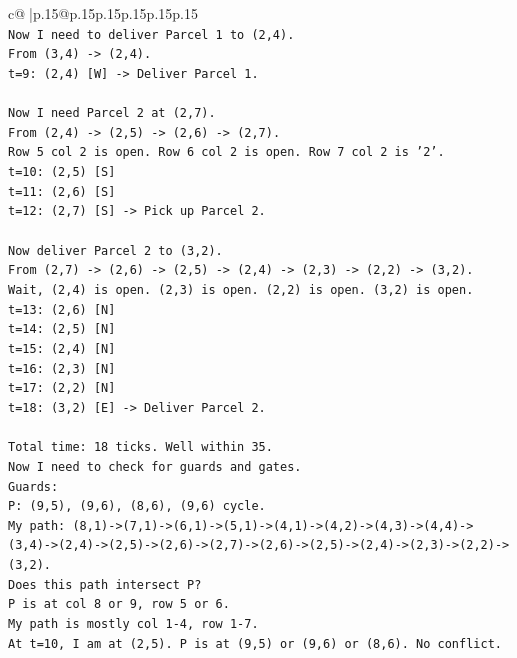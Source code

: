 \documentclass{article}
\begin{document}
{\begin{supertabular}{c@{$\;$}|p{.15\linewidth}@{}p{.15\linewidth}p{.15\linewidth}p{.15\linewidth}p{.15\linewidth}p{.15\linewidth}}
{{{\\ 
\texttt{Now I need to deliver Parcel 1 to (2,4).} \\
\texttt{From (3,4) {-}> (2,4).} \\
\texttt{t=9: (2,4) {[}W{]} {-}> Deliver Parcel 1.} \\
\\ 
\texttt{Now I need Parcel 2 at (2,7).} \\
\texttt{From (2,4) {-}> (2,5) {-}> (2,6) {-}> (2,7).} \\
\texttt{Row 5 col 2 is open. Row 6 col 2 is open. Row 7 col 2 is '2'.} \\
\texttt{t=10: (2,5) {[}S{]}} \\
\texttt{t=11: (2,6) {[}S{]}} \\
\texttt{t=12: (2,7) {[}S{]} {-}> Pick up Parcel 2.} \\
\\ 
\texttt{Now deliver Parcel 2 to (3,2).} \\
\texttt{From (2,7) {-}> (2,6) {-}> (2,5) {-}> (2,4) {-}> (2,3) {-}> (2,2) {-}> (3,2).} \\
\texttt{Wait, (2,4) is open. (2,3) is open. (2,2) is open. (3,2) is open.} \\
\texttt{t=13: (2,6) {[}N{]}} \\
\texttt{t=14: (2,5) {[}N{]}} \\
\texttt{t=15: (2,4) {[}N{]}} \\
\texttt{t=16: (2,3) {[}N{]}} \\
\texttt{t=17: (2,2) {[}N{]}} \\
\texttt{t=18: (3,2) {[}E{]} {-}> Deliver Parcel 2.} \\
\\ 
\texttt{Total time: 18 ticks. Well within 35.} \\
\texttt{Now I need to check for guards and gates.} \\
\texttt{Guards:} \\
\texttt{P: (9,5), (9,6), (8,6), (9,6) cycle.} \\
\texttt{My path: (8,1){-}>(7,1){-}>(6,1){-}>(5,1){-}>(4,1){-}>(4,2){-}>(4,3){-}>(4,4){-}>(3,4){-}>(2,4){-}>(2,5){-}>(2,6){-}>(2,7){-}>(2,6){-}>(2,5){-}>(2,4){-}>(2,3){-}>(2,2){-}>(3,2).} \\
\texttt{Does this path intersect P?} \\
\texttt{P is at col 8 or 9, row 5 or 6.} \\
\texttt{My path is mostly col 1{-}4, row 1{-}7.} \\
\texttt{At t=10, I am at (2,5). P is at (9,5) or (9,6) or (8,6). No conflict.} \\
}}}
\end{supertabular}}
\end{document}
